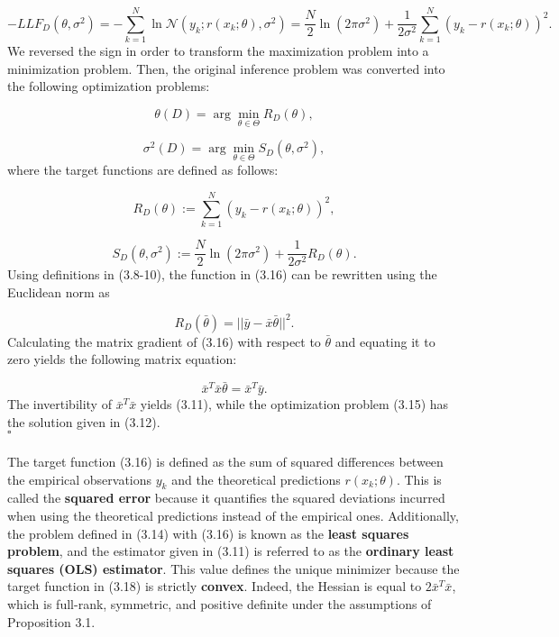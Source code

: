 \documentclass{report}
\begin{document}
\begin{equation}
-LLF_{D}(\theta,\sigma^2)=-\sum_{k=1}^N\ln\mathcal{N}(y_k;r(x_k;\theta),\sigma^2)=\frac{N}{2}\ln(2\pi\sigma^2)+\frac{1}{2\sigma^2}\sum_{k=1}^N(y_k-r(x_k;\theta))^2.
\end{equation}
We reversed the sign in order to transform the maximization problem into a minimization problem. Then, the original inference problem was converted into the following optimization problems:

\begin{equation}
\theta(D) = \arg\min_{\theta \in \Theta} R_{D}(\theta),
\end{equation}

\begin{equation}
\sigma^2(D) = \arg\min_{\theta \in \Theta} S_{D}(\theta, \sigma^2),
\end{equation}
where the target functions are defined as follows:

\begin{equation}
R_{D}(\theta) := \sum_{k=1}^N(y_k-r(x_k;\theta))^2,
\end{equation}

\begin{equation}
S_{D}(\theta,\sigma^2) := \frac{N}{2}\ln(2\pi\sigma^2)+\frac{1}{2\sigma^2}R_{D}(\theta).
\end{equation}
Using definitions in (3.8-10), the function in (3.16) can be rewritten using the Euclidean norm as

\begin{equation}
R_{D}(\bar{\theta}) = ||\bar{y} -\bar{x}\bar{\theta}||^2.
\end{equation}
Calculating the matrix gradient of (3.16) with respect to $\bar{\theta}$ and equating it to zero yields the following matrix equation:

\begin{equation}
\bar{x}^T\bar{x}\bar{\theta} = \bar{x}^T\bar{y}.
\end{equation}
The invertibility of $\bar{x}^T\bar{x}$ yields (3.11), while the optimization problem (3.15) has the solution given in (3.12).\\$\square$\\\\
The target function (3.16) is defined as the sum of squared differences between the empirical observations $y_k$ and the theoretical predictions $r(x_k;\theta)$. This is called the \textbf{squared error} because it quantifies the squared deviations incurred when using the theoretical predictions instead of the empirical ones. Additionally, the problem defined in (3.14) with (3.16) is known as the \textbf{least squares problem}, and the estimator given in (3.11) is referred to as the \textbf{ordinary least squares (OLS) estimator}. This value defines the unique minimizer because the target function in (3.18) is strictly \textbf{convex}. Indeed, the Hessian is equal to $2\bar{x}^T\bar{x}$, which is full-rank, symmetric, and positive definite under the assumptions of Proposition 3.1.
\end{document}
